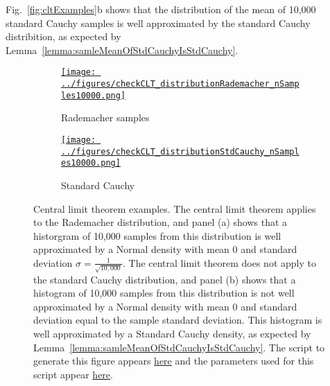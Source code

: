 \documentclass[12pt]{article}
\def\fig_width{3.5in}
\begin{document}
\begin{appendices}
Fig.~\ref{fig:cltExamples}b shows that the distribution of the mean of 10,000
standard Cauchy samples is well approximated by the standard Cauchy
distribition, as expected by Lemma~\ref{lemma:samleMeanOfStdCauchyIsStdCauchy}.

\begin{figure}[H]
    \begin{center}

        \begin{subfigure}{1.0\textwidth}
            \centering
            \href{https://www.gatsby.ucl.ac.uk/~rapela/neuroinformatics/2023/ws1/figures/checkCLT_distributionRademacher_nSamples10000.html}{\texttt{[image: ../figures/checkCLT\_distributionRademacher\_nSamples10000.png]}}

            \caption{Rademacher samples}

            \label{fig:cltExamples_1}
        \end{subfigure}

        \begin{subfigure}{1.0\textwidth}
            \centering
            \href{https://www.gatsby.ucl.ac.uk/~rapela/neuroinformatics/2023/ws1/figures/checkCLT_distributionStdCauchy_nSamples10000.html}{\texttt{[image: ../figures/checkCLT\_distributionStdCauchy\_nSamples10000.png]}}

            \caption{Standard Cauchy}

            \label{fig:cltExamples_2}
        \end{subfigure}

        \caption{Central limit theorem examples. The central limit theorem
        applies to the Rademacher distribution, and panel (a) shows that a
        historgram of 10,000 samples from this distribution is well
        approximated by a Normal density with mean 0 and standard deviation
        $\sigma=\frac{1}{\sqrt{10,000}}$. The central limit theorem does not
        apply to the standard Cauchy distribution, and panel (b) shows that a
        histogram of 10,000 samples from this distribution is not well
        approximated by a Normal density with mean 0 and standard deviation
        equal to the sample standard deviation. This histogram is well
        approximated by a Standard Cauchy density, as expected by
        Lemma~\ref{lemma:samleMeanOfStdCauchyIsStdCauchy}.
        The script to generate this figure appears
        \href{https://github.com/joacorapela/neuroinformatics23/blob/master/worksheets/ws1/mySolution/code/scripts/doCheckCLT.py}{here}
        and the parameters used for this script appear
        \href{https://github.com/joacorapela/neuroinformatics23/blob/master/worksheets/ws1/mySolution/code/scripts/doCheckCLT.csh}{here}.
        }


\end{center}
\end{figure}
\end{appendices}
\end{document}
